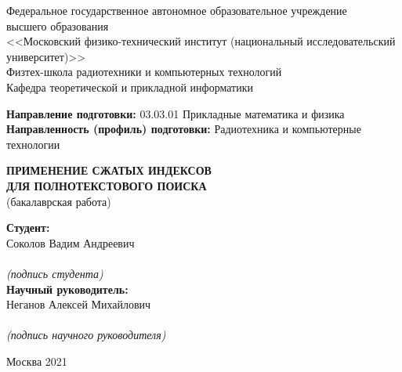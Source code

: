 \begin{center}
    Федеральное государственное автономное образовательное учреждение\\
    высшего образования\\
    <<Московский физико-технический институт (национальный исследовательский университет)>>\\
    Физтех-школа радиотехники и компьютерных технологий\\
    Кафедра теоретической и прикладной информатики\\
\end{center}

\vspace{2mm}

\begin{flushleft}
    \textbf{Направление подготовки:} 03.03.01 Прикладные математика и физика\\
    \textbf{Направленность (профиль) подготовки:} Радиотехника и компьютерные технологии\\
\end{flushleft}

\vspace{24mm}

\begin{center}%
    \large{\textbf{ПРИМЕНЕНИЕ СЖАТЫХ ИНДЕКСОВ\\ДЛЯ ПОЛНОТЕКСТОВОГО ПОИСКА}}\\
    (бакалаврская работа)\\
\end{center}

\vspace{20mm}

\hspace{90mm}
\begin{minipage}{0.4\textwidth}
    \begin{flushleft}
        \textbf{Студент:}\\Соколов Вадим Андреевич\\
        \vspace{4mm}
        \hrulefill\\
        {\centering\scriptsize\textit{(подпись студента)}\\}
        \textbf{Научный руководитель:}\\Неганов Алексей Михайлович\\
        \vspace{4mm}
        \hrulefill\\
        {\centering\scriptsize\textit{(подпись научного руководителя)}\\}
    \end{flushleft}
\end{minipage}

\vspace*{\fill}

\begin{center}
    Москва 2021
\end{center}

\thispagestyle{empty}